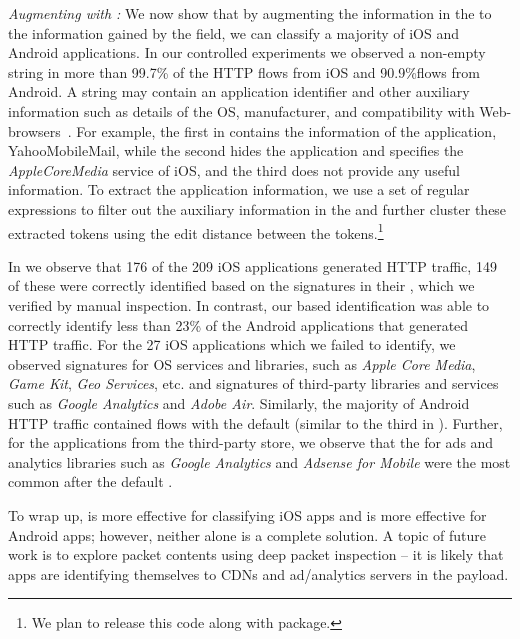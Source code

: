 \emph{Augmenting with \useragent: } We now show that by augmenting the information in the \useragent to the information gained by the \httphost field, we can classify a majority of iOS and Android applications. 
In our controlled experiments we observed a non-empty \useragent string in more than 99.7\% of the HTTP flows from iOS and 90.9\%flows from Android. 
A \useragent string may contain an application identifier and other auxiliary information such as details of the OS, manufacturer, and compatibility with Web-browsers~\cite{mozilla:useragentdetection}. 
For example, the first \useragent in  contains the information of the application, YahooMobileMail, while the second \useragent hides the application and specifies the \emph{AppleCoreMedia} service of iOS, and the third does not provide any useful information. 
To extract the application information, we use a set of regular expressions to filter out the auxiliary information in the \useragent and further cluster these extracted tokens using the edit distance between the tokens.\footnote{We plan to release this code along with \platname package.}

In  we observe that 176 of the 209 iOS applications generated HTTP traffic, 149 of these were correctly identified based on the signatures in their \useragent, which we verified by manual inspection.
In contrast, our \useragent based identification was able to correctly identify less than 23\% of the Android applications that generated HTTP traffic. 
For the 27 iOS applications which we failed to identify, we observed signatures for OS services and libraries, such as \emph{Apple Core Media}, \emph{Game Kit}, \emph{Geo Services}, etc. and signatures of third-party libraries and services such as \emph{Google Analytics} and \emph{Adobe Air}.
Similarly, the majority of Android HTTP traffic contained flows with the default \useragent (similar to the third \useragent in ).
Further, for the applications from the third-party store, we observe that the \useragent for ads and analytics libraries such as \emph{Google Analytics} and \emph{Adsense for Mobile} were the most common \useragent after the default \useragent.

To wrap up, \useragent is more effective for classifying iOS apps and \httphost is more effective for Android apps; however, neither alone is a complete 
solution. A topic of future work is to explore packet contents using deep packet inspection -- it is likely that apps are identifying themselves to CDNs and 
ad/analytics servers in the payload. 

